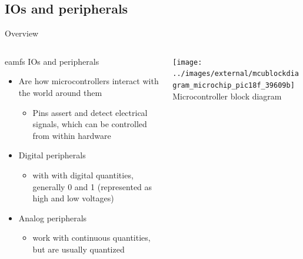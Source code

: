 \documentclass{beamer}
\begin{document}
\subsection{IOs and peripherals}
\begin{frame}{Overview}
  \begin{columns}[T]
    \begin{column}{.6\textwidth}eamfs
      IOs and peripherals
      \begin{itemize}
        \item Are how microcontrollers interact with the world around them
        \begin{itemize}
          \item Pins assert and detect electrical signals, which can be controlled from within hardware
        \end{itemize}
        \item Digital peripherals
        \begin{itemize}
          \item with with digital quantities, generally 0 and 1 (represented as high and low voltages)
        \end{itemize}
        \item Analog peripherals
        \begin{itemize}
          \item work with continuous quantities, but are usually quantized
        \end{itemize}
      \end{itemize}
    \end{column}

    \begin{column}{0.4\textwidth} \centering
      \texttt{[image: ../images/external/mcublockdiagram\_microchip\_pic18f\_39609b]} \\
      Microcontroller block diagram
    \end{column}
  \end{columns}
\end{frame}
\end{document}
